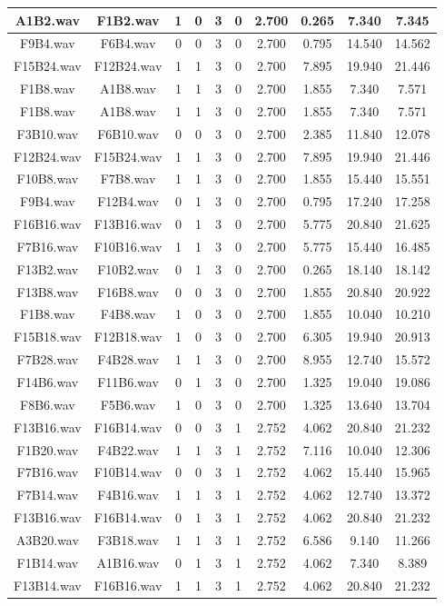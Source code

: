 \documentclass[11pt,a4paper]{book}
\begin{document}
\begin{longtable}[c]{|c|c|c|c|c|c|c|c|c|c|}
A1B2.wav&F1B2.wav&1&0&3&0&2.700&0.265&7.340&7.345\\ \hline
F9B4.wav&F6B4.wav&0&0&3&0&2.700&0.795&14.540&14.562\\ \hline
F15B24.wav&F12B24.wav&1&1&3&0&2.700&7.895&19.940&21.446\\ \hline
F1B8.wav&A1B8.wav&1&1&3&0&2.700&1.855&7.340&7.571\\ \hline
F1B8.wav&A1B8.wav&1&1&3&0&2.700&1.855&7.340&7.571\\ \hline
F3B10.wav&F6B10.wav&0&0&3&0&2.700&2.385&11.840&12.078\\ \hline
F12B24.wav&F15B24.wav&1&1&3&0&2.700&7.895&19.940&21.446\\ \hline
F10B8.wav&F7B8.wav&1&1&3&0&2.700&1.855&15.440&15.551\\ \hline
F9B4.wav&F12B4.wav&0&1&3&0&2.700&0.795&17.240&17.258\\ \hline
F16B16.wav&F13B16.wav&0&1&3&0&2.700&5.775&20.840&21.625\\ \hline
F7B16.wav&F10B16.wav&1&1&3&0&2.700&5.775&15.440&16.485\\ \hline
F13B2.wav&F10B2.wav&0&1&3&0&2.700&0.265&18.140&18.142\\ \hline
F13B8.wav&F16B8.wav&0&0&3&0&2.700&1.855&20.840&20.922\\ \hline
F1B8.wav&F4B8.wav&1&0&3&0&2.700&1.855&10.040&10.210\\ \hline
F15B18.wav&F12B18.wav&1&0&3&0&2.700&6.305&19.940&20.913\\ \hline
F7B28.wav&F4B28.wav&1&1&3&0&2.700&8.955&12.740&15.572\\ \hline
F14B6.wav&F11B6.wav&0&1&3&0&2.700&1.325&19.040&19.086\\ \hline
F8B6.wav&F5B6.wav&1&0&3&0&2.700&1.325&13.640&13.704\\ \hline
F13B16.wav&F16B14.wav&0&0&3&1&2.752&4.062&20.840&21.232\\ \hline
F1B20.wav&F4B22.wav&1&1&3&1&2.752&7.116&10.040&12.306\\ \hline
F7B16.wav&F10B14.wav&0&0&3&1&2.752&4.062&15.440&15.965\\ \hline
F7B14.wav&F4B16.wav&1&1&3&1&2.752&4.062&12.740&13.372\\ \hline
F13B16.wav&F16B14.wav&0&1&3&1&2.752&4.062&20.840&21.232\\ \hline
A3B20.wav&F3B18.wav&1&1&3&1&2.752&6.586&9.140&11.266\\ \hline
F1B14.wav&A1B16.wav&0&1&3&1&2.752&4.062&7.340&8.389\\ \hline
F13B14.wav&F16B16.wav&1&1&3&1&2.752&4.062&20.840&21.232\\ \hline

\end{longtable}
\end{document}

